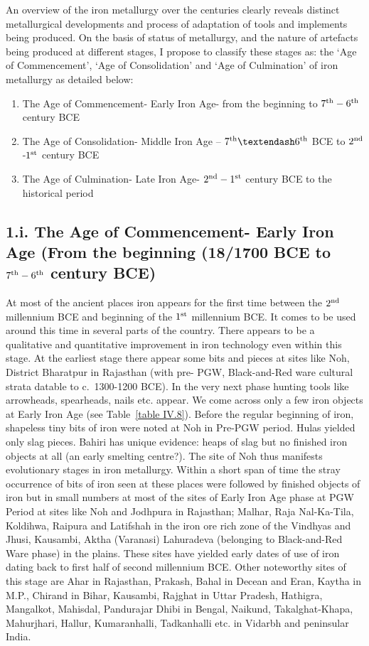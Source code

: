  An overview of the iron metallurgy over the centuries clearly reveals distinct metallurgical developments and process of adaptation of tools and implements being produced. On the basis of status of metallurgy, and the nature of artefacts being produced at different stages, I propose to classify these stages as: the ‘Age of Commencement’, ‘Age of Consolidation’ and ‘Age of Culmination’ of iron metallurgy as detailed below: 
\begin{enumerate}
\item The Age of Commencement- Early Iron Age- from the beginning to $7^{\rm th} -6^{\rm th}$ century BCE
\item The Age of Consolidation- Middle Iron Age – $7^{\rm th} – 6^{\rm th}$ BCE to $2^{\rm nd}$ -$1^{\rm st}$ century BCE
\item The Age of Culmination- Late Iron Age- $2^{\rm nd} -1^{\rm st}$ century BCE to the historical period
\end{enumerate}

\subsection*{1.i. The Age of Commencement- Early Iron Age (From the beginning (18/1700 BCE to $7^{\rm th} -6^{\rm th}$ century BCE)}\label{chapter4-subsection-1}

At most of the ancient places iron appears for the first time between the $2^{\rm nd}$ millennium BCE and beginning of the $1^{\rm st}$ millennium BCE. It comes to be used around this time in several parts of the country. There appears to be a qualitative and quantitative improvement in iron technology even within this stage. At the earliest stage there appear some bits and pieces at sites like Noh, District Bharatpur in Rajasthan (with pre- PGW, Black-and-Red ware cultural strata datable to c.~1300-1200 BCE). In the very next phase hunting tools like arrowheads, spearheads, nails etc. appear. We come across only a few iron objects at Early Iron Age (see Table~\ref{table IV.8}). Before the regular beginning of iron, shapeless tiny bits of iron were noted at Noh in Pre-PGW period. Hulas yielded only slag pieces. Bahiri has unique evidence: heaps of slag but no finished iron objects at all (an early smelting centre?). The site of Noh thus manifests evolutionary stages in iron metallurgy. Within a short span of time the stray occurrence of bits of iron seen at these places were followed by finished objects of iron but in small numbers at most of the sites of Early Iron Age phase at PGW Period at sites like Noh and Jodhpura in Rajasthan; Malhar, Raja Nal-Ka-Tila, Koldihwa, Raipura and Latifshah in the iron ore rich zone of the Vindhyas and Jhusi, Kausambi, Aktha (Varanasi) Lahuradeva (belonging to Black-and-Red Ware phase) in the plains. These sites have yielded early dates of use of iron dating back to first half of second millennium BCE. Other noteworthy sites of this stage are Ahar in Rajasthan, Prakash, Bahal in Decean and Eran, Kaytha in M.P., Chirand in Bihar, Kausambi, Rajghat in Uttar Pradesh, Hathigra, Mangalkot, Mahisdal, Pandurajar Dhibi in Bengal, Naikund, Takalghat-Khapa, Mahurjhari, Hallur, Kumaranhalli, Tadkanhalli etc. in Vidarbh and peninsular India. 

